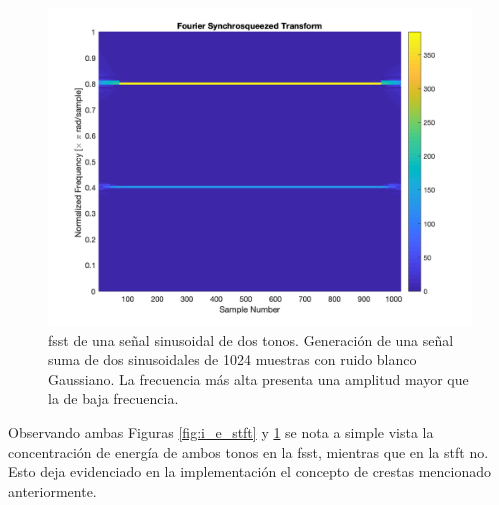 \begin{figure}[H]
  \centering
  \includegraphics[scale=0.35]{chapters/chapter-05/images/fsst.png}
  \caption[\acrshort{fsst} de una señal sinusoidal de dos tonos]{\acrshort{fsst} de una señal sinusoidal de dos tonos.
  Generación de una señal suma de dos sinusoidales de 1024 muestras con ruido blanco Gaussiano. La frecuencia más alta
  presenta una amplitud mayor que la de baja frecuencia.}
  \label{fig:i_e_fsst}
\end{figure}

\indent Observando ambas Figuras \ref{fig:i_e_stft} y \ref{fig:i_e_fsst} se nota a simple vista la concentración de
energía de ambos tonos en la \acrshort{fsst}, mientras que en la \acrshort{stft} no. Esto deja evidenciado en la
implementación el concepto de crestas mencionado anteriormente.
